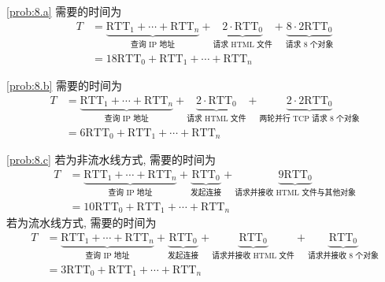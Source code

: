 \documentclass[boxes]{homework}
\begin{document}
\begin{solution}
    \ref{prob:8.a} 需要的时间为
    \begin{equation}
        \begin{aligned}
            T
             & = \underbrace{\mathrm{RTT}_{1} + \cdots + \mathrm{RTT}_{n} }_{
                \text{查询 IP 地址}} + \underbrace{ 2 \cdot \mathrm{RTT}_{0} }
            _{\text{请求 HTML 文件}} + \underbrace{ 8 \cdot
            2 \mathrm{RTT}_{0} }_{\text{请求 8 个对象}}                       \\
             & = 18 \mathrm{RTT}_{0} + \mathrm{RTT}_{1} + \cdots +
            \mathrm{RTT}_{n}
        \end{aligned}
    \end{equation}

    \ref{prob:8.b} 需要的时间为
    \begin{equation}
        \begin{aligned}
            T
             & = \underbrace{\mathrm{RTT}_{1} + \cdots + \mathrm{RTT}_{n} }_{
                \text{查询 IP 地址}} + \underbrace{ 2 \cdot \mathrm{RTT}_{0} }
            _{\text{请求 HTML 文件}} + \underbrace{ 2 \cdot
            2 \mathrm{RTT}_{0} }_{\text{两轮并行 TCP 请求 8 个对象}}          \\
             & = 6 \mathrm{RTT}_{0} + \mathrm{RTT}_{1} + \cdots +
            \mathrm{RTT}_{n}
        \end{aligned}
    \end{equation}

    \ref{prob:8.c} 若为非流水线方式, 需要的时间为
    \begin{equation}
        \begin{aligned}
            T
             & = \underbrace{\mathrm{RTT}_{1} + \cdots + \mathrm{RTT}_{n} }_{
                \text{查询 IP 地址}}
            + \underbrace{ \mathrm{RTT}_{0} }_{\text{发起连接}}
            + \underbrace{ 9 \mathrm{RTT}_{0} }_{
            \text{请求并接收 HTML 文件与其他对象}}                            \\
             & = 10 \mathrm{RTT}_{0} + \mathrm{RTT}_{1} + \cdots +
            \mathrm{RTT}_{n}
        \end{aligned}
    \end{equation}
    若为流水线方式, 需要的时间为
    \begin{equation}
        \begin{aligned}
            T
             & = \underbrace{\mathrm{RTT}_{1} + \cdots + \mathrm{RTT}_{n} }_{
                \text{查询 IP 地址}}
            + \underbrace{ \mathrm{RTT}_{0} }_{\text{发起连接}}
            + \underbrace{ \mathrm{RTT}_{0} }_{\text{请求并接收 HTML 文件}}
            + \underbrace{ \mathrm{RTT}_{0} }_{\text{请求并接收 8 个对象}}    \\
             & = 3 \mathrm{RTT}_{0} + \mathrm{RTT}_{1} + \cdots +
            \mathrm{RTT}_{n}
        \end{aligned}
    \end{equation}
\end{solution}
\end{document}
